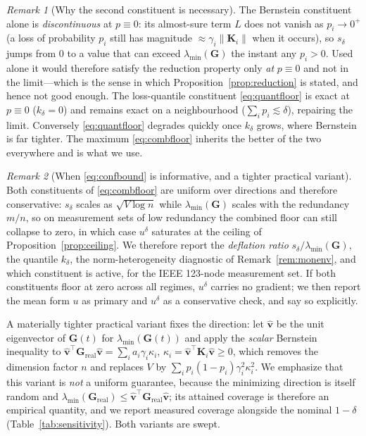 \documentclass[journal]{IEEEtran}
\theoremstyle{plain}
\theoremstyle{definition}
\theoremstyle{remark}
\newtheorem{remark}{Remark}
\newcommand{\bG}{\mathbf{G}}
\newcommand{\lmin}{\lambda_{\min}}
\begin{document}
\begin{remark}[Why the second constituent is necessary]
\label{rem:whyquantile}
The Bernstein constituent alone is \emph{discontinuous} at $p\equiv0$: its
almost-sure term $L$ does not vanish as $p_i\to0^{+}$ (a loss of
probability $p_i$ still has magnitude $\approx\gamma_i\|\mathbf{K}_i\|$
when it occurs), so $s_{\delta}$ jumps from $0$ to a value that can exceed
$\lmin(\bG)$ the instant any $p_i>0$. Used alone it would therefore
satisfy the reduction property only \emph{at} $p\equiv0$ and not in the
limit---which is the sense in which
Proposition~\ref{prop:reduction} is stated, and hence not good enough. The
loss-quantile constituent \eqref{eq:quantfloor} is exact at $p\equiv0$
($k_\delta=0$) and remains exact on a neighbourhood
($\sum_ip_i\lesssim\delta$), repairing the limit. Conversely
\eqref{eq:quantfloor} degrades quickly once $k_\delta$ grows, where
Bernstein is far tighter. The maximum \eqref{eq:combfloor} inherits the
better of the two everywhere and is what we use.
\end{remark}

\begin{remark}[When \eqref{eq:confbound} is informative, and a tighter
practical variant]
\label{rem:tightness}
Both constituents of \eqref{eq:combfloor} are uniform over directions and
therefore conservative: $s_{\delta}$ scales as $\sqrt{V\log n}$ while
$\lmin(\bG)$ scales with the redundancy $m/n$, so on measurement sets of
low redundancy the combined floor can still collapse to zero, in which
case $u^{\delta}$ saturates at the ceiling of
Proposition~\ref{prop:ceiling}. We therefore report the \emph{deflation
ratio} $s_{\delta}/\lmin(\bG)$, the quantile $k_\delta$, the
norm-heterogeneity diagnostic of Remark~\ref{rem:monenv}, and which
constituent is active, for the IEEE 123-node measurement set. If both
constituents floor at zero across all regimes, $u^{\delta}$ carries no
gradient; we then report the mean form $u$ as primary and $u^{\delta}$ as
a conservative check, and say so explicitly.

A materially tighter practical variant fixes the direction: let
$\hat{\mathbf{v}}$ be the unit eigenvector of $\bG(t)$ for
$\lmin(\bG(t))$ and apply the \emph{scalar} Bernstein inequality to
$\hat{\mathbf{v}}^{\top}\bG_{\mathrm{real}}\hat{\mathbf{v}}
=\sum_i a_i\gamma_i\kappa_i$, $\kappa_i=\hat{\mathbf{v}}^{\top}\mathbf{K}_i\hat{\mathbf{v}}\ge0$,
which removes the dimension factor $n$ and replaces $V$ by
$\sum_i p_i(1-p_i)\gamma_i^2\kappa_i^{2}$. We emphasize that this variant
is \emph{not} a uniform guarantee, because the minimizing direction is
itself random and $\lmin(\bG_{\mathrm{real}})\le
\hat{\mathbf{v}}^{\top}\bG_{\mathrm{real}}\hat{\mathbf{v}}$; its
attained coverage is therefore an empirical quantity, and we report
measured coverage alongside the nominal $1-\delta$
(Table~\ref{tab:sensitivity}). Both variants are swept.
\end{remark}
\end{document}
